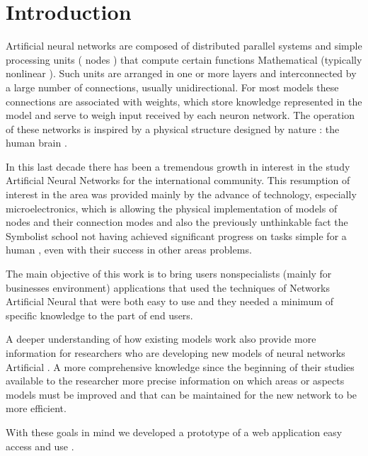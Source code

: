 \section{Introduction}

Artificial neural networks are composed of distributed parallel systems 
and simple processing units ( nodes ) that compute certain functions 
Mathematical (typically nonlinear ). Such units are arranged in one or
more layers and interconnected by a large number of connections, usually
unidirectional. For most models these connections are associated with weights,
which store knowledge represented in the model and serve to weigh
input received by each neuron network. The operation of these networks is
inspired by a physical structure designed by nature : the human brain 
\cite{Bishop2005}.

In this last decade there has been a tremendous growth in interest in the study
Artificial Neural Networks for the international community. This resumption of
interest in the area was provided mainly by the advance of technology,
especially microelectronics, which is allowing the physical implementation of
models of nodes and their connection modes and also the previously unthinkable
fact the Symbolist school not having achieved significant progress on tasks
simple for a human , even with their success in other areas problems.

The main objective of this work is to bring users nonspecialists (mainly for 
businesses environment) applications that used the techniques of Networks 
Artificial Neural that were both easy to use and they needed a minimum of 
specific knowledge to the part of end users.

A deeper understanding of how existing models work also provide more 
information for researchers who are developing new models of neural networks
Artificial . A more comprehensive knowledge since the beginning of their studies
available to the researcher more precise information on which areas or
aspects models must be improved and that can be maintained for
the new network to be more efficient.

With these goals in mind we developed a prototype of a web application
easy access and use .